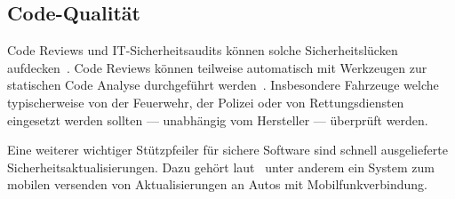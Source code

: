 \subsection{Code-Qualität}
Code Reviews und IT-Sicherheits\-audits können solche Sicherheits\-lücken
aufdecken~\cite{Howard2006}. Code Reviews können teilweise automatisch mit
Werkzeugen zur statischen Code Analyse durchgeführt werden~\cite{McGraw2008}.
Insbesondere Fahrzeuge welche typischerweise von der Feuerwehr, der Polizei
oder von Rettungsdiensten eingesetzt werden sollten --- unabhängig vom Hersteller
--- überprüft werden.

Eine weiterer wichtiger Stützpfeiler für sichere Software sind schnell
ausgelieferte Sicherheits\-aktualisierungen. Dazu gehört
laut~\cite{Mahaffey2015} unter anderem ein System zum mobilen versenden von
Aktualisierungen an Autos mit Mobilfunk\-verbindung.

%
%
%
%
%
%
%
% 

